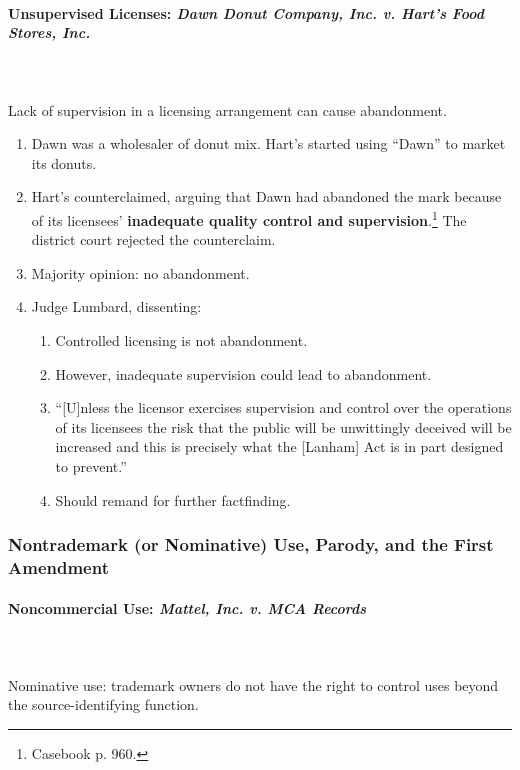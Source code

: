\paragraph{Unsupervised Licenses: \emph{Dawn Donut Company, Inc. v. Hart's 
Food Stores, Inc.}}
~\\\\
Lack of supervision in a licensing arrangement can cause abandonment.

\begin{enumerate}
    \item Dawn was a wholesaler of donut mix. Hart's started using ``Dawn'' to 
    market its donuts.
    \item Hart's counterclaimed, arguing that Dawn had abandoned the mark 
    because of its licensees' \textbf{inadequate quality control and 
    supervision}.\footnote{Casebook p. 960.} The district court rejected the 
    counterclaim.
    \item Majority opinion: no abandonment.
    \item Judge Lumbard, dissenting:
    \begin{enumerate}
        \item Controlled licensing is not abandonment.
        \item However, inadequate supervision could lead to abandonment. 
        \item ``[U]nless the licensor exercises supervision and control over 
        the operations of its licensees the risk that the public will be 
        unwittingly deceived will be increased and this is precisely what the 
        [Lanham] Act is in part designed to prevent.''
        \item Should remand for further factfinding.
    \end{enumerate}
\end{enumerate}

\subsubsection{Nontrademark (or Nominative) Use, Parody, and the First 
Amendment}

\paragraph{Noncommercial Use: \emph{Mattel, Inc. v. MCA Records}}
~\\\\
Nominative use: trademark owners do not have the right to control uses beyond 
the source-identifying function.

